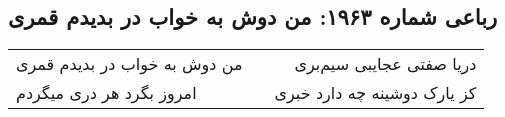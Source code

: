 \begin{center}
\section*{رباعی شماره ۱۹۶۳: من دوش به خواب در بدیدم قمری}
\label{sec:1963}
\begin{longtable}{l p{0.5cm} r}
من دوش به خواب در بدیدم قمری
&&
دریا صفتی عجایبی سیم‌بری
\\
امروز بگرد هر دری میگردم
&&
کز یارک دوشینه چه دارد خبری
\\
\end{longtable}
\end{center}
